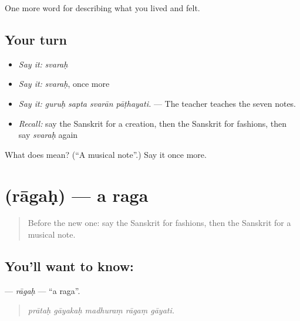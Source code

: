 \begin{grammarlens}[title={What you've built}]
One more word for describing what you lived and felt.
\end{grammarlens}

\subsection*{Your turn}
\begin{itemize}
\raggedright
  \item \emph{Say it:} \emph{svaraḥ}
  \item \emph{Say it:} \emph{svaraḥ}, once more
  \item \emph{Say it:} \emph{guruḥ sapta svarān pāṭhayati.} — The teacher teaches the seven notes.
  \item \emph{Recall:} say the Sanskrit for a creation, then the Sanskrit for fashions, then say \emph{svaraḥ} again
\end{itemize}

\begin{tcolorbox}[breakable,colback=teal!4,colframe=teal!35!black,title={Before you move on}]
What does  mean? (\textquotedblleft{}A musical note\textquotedblright{}.) Say it once more.
\end{tcolorbox}
\section[\texorpdfstring{\sk{रागः} (rāgaḥ)}{रागः (rāgaḥ)}]{ (rāgaḥ) — a raga}

\label{lesson:SA-C520-ragah}



\begin{quote}
Before the new one: say the Sanskrit for fashions, then the Sanskrit for a musical note.
\end{quote}

\subsection*{You'll want to know: }
\textbf{} — \emph{rāgaḥ} — \textquotedblleft{}a raga\textquotedblright{}.

\begin{quote}
    
\end{quote}

\begin{quote}
\emph{prātaḥ gāyakaḥ madhuraṃ rāgaṃ gāyati.}
\end{quote}

